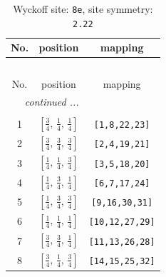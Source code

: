\documentclass[fleqn,8pt]{jsarticle}
\begin{document}
\renewcommand{\arraystretch}{1.2}
\begin{longtable}{ccc}
\caption{Wyckoff site: {\tt 8e}, site symmetry: {\tt 2.22}}
 \\
 \hline \hline
No. & position & mapping \\ \hline \endfirsthead

\multicolumn{2}{l}{\tablename\ \thetable{}} \\
 \hline \hline
No. & position & mapping \\ \hline \endhead

 \hline \hline
\multicolumn{2}{r}{\footnotesize\it continued ...} \\ \endfoot

 \hline \hline
\multicolumn{2}{r}{} \\ \endlastfoot

1 & $\left[ \frac{3}{4},\, \frac{1}{4},\, \frac{1}{4} \right]$ & {\tt [1,8,22,23]} \\ \hline
2 & $\left[ \frac{3}{4},\, \frac{3}{4},\, \frac{3}{4} \right]$ & {\tt [2,4,19,21]} \\ \hline
3 & $\left[ \frac{1}{4},\, \frac{1}{4},\, \frac{3}{4} \right]$ & {\tt [3,5,18,20]} \\ \hline
4 & $\left[ \frac{1}{4},\, \frac{3}{4},\, \frac{1}{4} \right]$ & {\tt [6,7,17,24]} \\ \hline
5 & $\left[ \frac{1}{4},\, \frac{3}{4},\, \frac{3}{4} \right]$ & {\tt [9,16,30,31]} \\ \hline
6 & $\left[ \frac{1}{4},\, \frac{1}{4},\, \frac{1}{4} \right]$ & {\tt [10,12,27,29]} \\ \hline
7 & $\left[ \frac{3}{4},\, \frac{3}{4},\, \frac{1}{4} \right]$ & {\tt [11,13,26,28]} \\ \hline
8 & $\left[ \frac{3}{4},\, \frac{1}{4},\, \frac{3}{4} \right]$ & {\tt [14,15,25,32]} \\
\end{longtable}
\renewcommand{\arraystretch}{1.2}
\end{document}
